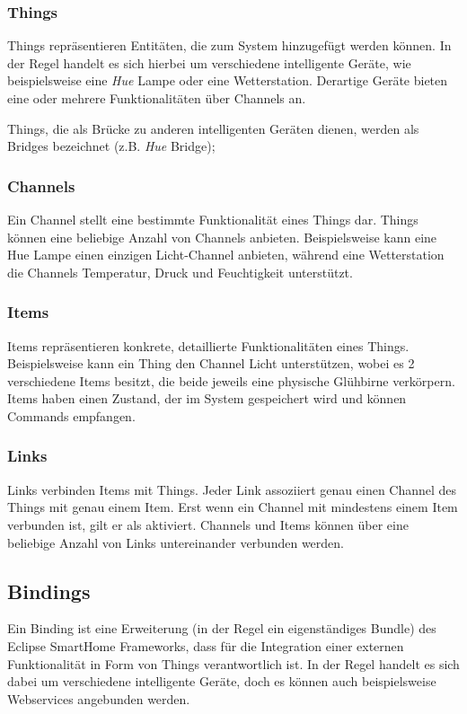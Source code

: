 \subsubsection{Things}
Things repräsentieren Entitäten, die zum System hinzugefügt werden können. In der Regel handelt es sich hierbei um verschiedene intelligente Geräte, wie beispielsweise eine \textit{Hue} Lampe oder eine Wetterstation. Derartige Geräte bieten eine oder mehrere Funktionalitäten über Channels an.

Things, die als Brücke zu anderen intelligenten Geräten dienen, werden als Bridges bezeichnet (z.B. \textit{Hue} Bridge);

\subsubsection{Channels}
Ein Channel stellt eine bestimmte Funktionalität eines Things dar. Things können eine beliebige Anzahl von Channels anbieten. Beispielsweise kann eine Hue Lampe einen einzigen \glqq Licht\grqq -Channel anbieten, während eine Wetterstation die Channels \glqq Temperatur\grqq , \glqq Druck\grqq{} und \glqq Feuchtigkeit\grqq{} unterstützt.

\subsubsection{Items}
Items repräsentieren konkrete, detaillierte Funktionalitäten eines Things. Beispielsweise kann ein Thing den Channel \glqq Licht\grqq{} unterstützen, wobei es 2 verschiedene Items besitzt, die beide jeweils eine physische Glühbirne verkörpern. Items haben einen Zustand, der im System gespeichert wird und können Commands empfangen.

\subsubsection{Links}
Links verbinden Items mit Things. Jeder Link assoziiert genau einen Channel des Things mit genau einem Item. Erst wenn ein Channel mit mindestens einem Item verbunden ist, gilt er als \glqq aktiviert\grqq{}. Channels und Items können über eine beliebige Anzahl von Links untereinander verbunden werden.


\subsection{Bindings}
Ein Binding ist eine Erweiterung (in der Regel ein eigenständiges Bundle) des Eclipse SmartHome Frameworks, dass für die Integration einer externen Funktionalität in Form von Things verantwortlich ist. 
In der Regel handelt es sich dabei um verschiedene intelligente Geräte, doch es können auch beispielsweise Webservices angebunden werden.

